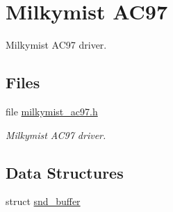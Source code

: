\hypertarget{group__lm32__milkymist__ac97}{}\section{Milkymist A\+C97}
\label{group__lm32__milkymist__ac97}


Milkymist A\+C97 driver.  


\subsection*{Files}
\begin{DoxyCompactItemize}
\item 
file \mbox{\hyperlink{milkymist__ac97_8h}{milkymist\+\_\+ac97.\+h}}
\begin{DoxyCompactList}\small\item\em Milkymist A\+C97 driver. \end{DoxyCompactList}\end{DoxyCompactItemize}
\subsection*{Data Structures}
\begin{DoxyCompactItemize}
\item 
struct \mbox{\hyperlink{structsnd__buffer}{snd\+\_\+buffer}}
\end{DoxyCompactItemize}
